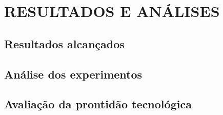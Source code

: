 \chapter{RESULTADOS E ANÁLISES}
\label{chap:result}


\section{Resultados alcançados}
\label{sec:resalcanc}


\section{Análise dos experimentos}
\label{sec:doe}


\section{Avaliação da prontidão tecnológica}
\label{sec:trl}

